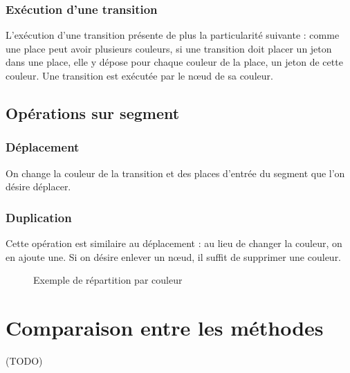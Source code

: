 \subsubsection{Exécution d'une transition}
L'exécution d'une transition présente de plus la particularité suivante : comme une place peut avoir plusieurs couleurs, si une transition doit placer un jeton dans une place, elle y dépose pour chaque couleur de la place, un jeton de cette couleur. 
Une transition est exécutée par le nœud de sa couleur.

\subsection{Opérations sur segment}
\subsubsection{Déplacement}
On change la couleur de la transition et des places d'entrée du segment que l'on désire déplacer.

\subsubsection{Duplication}
Cette opération est similaire au déplacement : au lieu de changer la couleur, on en ajoute une. Si on désire enlever un nœud, il suffit de supprimer une couleur.

\begin{figure}[h]
\centering

\caption{Exemple de répartition par couleur} 
\end{figure}

\section{Comparaison entre les méthodes}
(TODO)